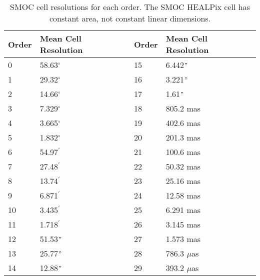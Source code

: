 \begin{table}[!htbp]
\smallskip
\begin{center}
   {\small
   \begin{tabular} {|l | l| l| l|}
   \hline
   Order & Mean Cell Resolution & Order & Mean Cell Resolution\\
   \hline
   0 	& 	58.63$^{\circ}$ &	15   &       6.442$"$	\\
   1 	& 	29.32$^{\circ}$ &	16   &       3.221$"$	\\
   2 	& 	14.66$^{\circ}$ &	17   &        1.61$"$	\\
   3	&	7.329$^{\circ}$ &	18   &       805.2 mas 	\\
   4	&	3.665$^{\circ}$ &	19   &       402.6   mas	\\
   5	&	1.832$^{\circ}$ &	20   &       201.3 mas	\\
   6 	& 	54.97$^{\prime}$ &	21   &       100.6 mas	\\
   7	&	27.48$^{\prime}$ &	22   &       50.32 mas	\\
   8	&	13.74$^{\prime}$ &	23   &       25.16 mas	\\
   9	&	6.871$^{\prime}$ &	24   &       12.58 mas	\\
   10	&	3.435$^{\prime}$ &	25   &        6.291 mas	\\
   11	&	1.718$^{\prime}$ &	26   &       3.145 mas	\\
   12 	& 	51.53$"$ &		27   &       1.573 mas	\\
   13	&	25.77$"$ &		28   &       786.3 $\mu$as	\\
   14	&	12.88$"$ &		29   &       393.2 $\mu$as	\\
   \hline
   \end{tabular}
   }
\caption[SMOC order and cell resolutions]{SMOC cell resolutions for each order. The SMOC HEALPix cell has
  constant area, not constant linear dimensions.}\label{table:orders}
\end{center}
\end{table}
